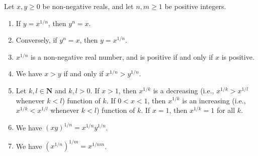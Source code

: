 \begin{lemma}\label{5.6.6}
    Let \(x, y \geq 0\) be non-negative reals, and let \(n, m \geq 1\) be positive integers.
    \begin{enumerate}
        \item If \(y = x^{1 / n}\), then \(y^n = x\).
        \item Conversely, if \(y^n = x\), then \(y = x^{1 / n}\).
        \item \(x^{1 / n}\) is a non-negative real number, and is positive if and only if \(x\) is positive.
        \item We have \(x > y\) if and only if \(x^{1 / n} > y^{1 / n}\).
        \item Let \(k, l \in \mathbf{N}\) and \(k, l > 0\).
              If \(x > 1\), then \(x^{1 / k}\) is a decreasing (i.e., \(x^{1 / k} > x^{1 / l}\) whenever \(k < l\)) function of \(k\).
              If \(0 < x < 1\), then \(x^{1 / k}\) is an increasing (i.e., \(x^{1 / k} < x^{1 / l}\) whenever \(k < l\)) function of \(k\).
              If \(x = 1\), then \(x^{1 / k} = 1\) for all \(k\).
        \item We have \((xy)^{1 / n} = x^{1 / n} y^{1 / n}\).
        \item We have \((x^{1 / n})^{1 / m} = x^{1 / nm}\).
    \end{enumerate}
\end{lemma}

